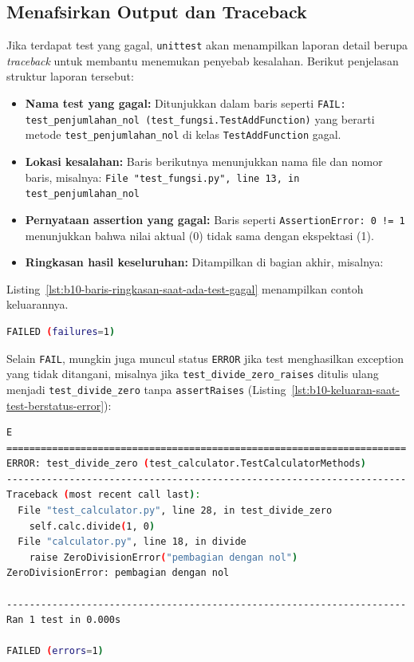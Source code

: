 \subsection{Menafsirkan Output dan Traceback}

Jika terdapat test yang gagal, \texttt{unittest} akan menampilkan laporan detail berupa \textit{traceback} untuk membantu menemukan penyebab kesalahan.  
Berikut penjelasan struktur laporan tersebut:

\begin{itemize}
    \item \textbf{Nama test yang gagal:}  
    Ditunjukkan dalam baris seperti  
    \texttt{FAIL: test\_penjumlahan\_nol (test\_fungsi.TestAddFunction)}  
    yang berarti metode \texttt{test\_penjumlahan\_nol} di kelas \texttt{TestAddFunction} gagal.

    \item \textbf{Lokasi kesalahan:}  
    Baris berikutnya menunjukkan nama file dan nomor baris, misalnya:  
    \texttt{File "test\_fungsi.py", line 13, in test\_penjumlahan\_nol}

    \item \textbf{Pernyataan assertion yang gagal:}  
    Baris seperti  
    \texttt{AssertionError: 0 != 1}  
    menunjukkan bahwa nilai aktual (0) tidak sama dengan ekspektasi (1).

    \item \textbf{Ringkasan hasil keseluruhan:}  
    Ditampilkan di bagian akhir, misalnya:
\end{itemize}

Listing~\ref{lst:b10-baris-ringkasan-saat-ada-test-gagal} menampilkan contoh keluarannya.

\begin{lstlisting}[language=bash, caption={Baris ringkasan saat ada test yang gagal}, label={lst:b10-baris-ringkasan-saat-ada-test-gagal}]
FAILED (failures=1)
\end{lstlisting}

Selain \texttt{FAIL}, mungkin juga muncul status \texttt{ERROR} jika test menghasilkan exception yang tidak ditangani, misalnya jika \texttt{test\_divide\_zero\_raises} ditulis ulang menjadi \texttt{test\_divide\_zero} tanpa \texttt{assertRaises} (Listing~\ref{lst:b10-keluaran-saat-test-berstatus-error}):

\begin{lstlisting}[language=bash, caption={Keluaran saat test berstatus ERROR}, label={lst:b10-keluaran-saat-test-berstatus-error}]
E
======================================================================
ERROR: test_divide_zero (test_calculator.TestCalculatorMethods)
----------------------------------------------------------------------
Traceback (most recent call last):
  File "test_calculator.py", line 28, in test_divide_zero
    self.calc.divide(1, 0)
  File "calculator.py", line 18, in divide
    raise ZeroDivisionError("pembagian dengan nol")
ZeroDivisionError: pembagian dengan nol

----------------------------------------------------------------------
Ran 1 test in 0.000s

FAILED (errors=1)
\end{lstlisting}

